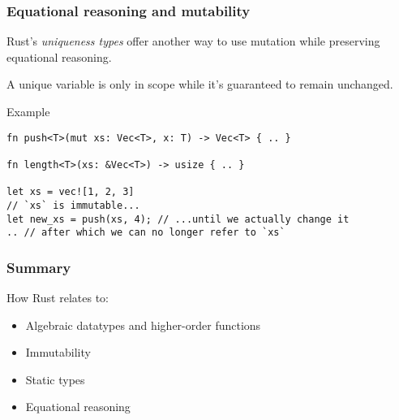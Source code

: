 \documentclass[t]{beamer}
\begin{document}
\begin{frame}[fragile]
\frametitle{Equational reasoning and mutability}
Rust's \emph{uniqueness types} offer another way to use mutation while
preserving equational reasoning.

\medskip

A unique variable is only in scope while it's guaranteed to remain unchanged.

\begin{block}{Example}
\begin{verbatim}
fn push<T>(mut xs: Vec<T>, x: T) -> Vec<T> { .. }

fn length<T>(xs: &Vec<T>) -> usize { .. }

let xs = vec![1, 2, 3]
// `xs` is immutable...
let new_xs = push(xs, 4); // ...until we actually change it
.. // after which we can no longer refer to `xs`
\end{verbatim}
\end{block}

\end{frame}


\begin{frame}[c]
\frametitle{Summary}

How Rust relates to:

\begin{itemize}
\item Algebraic datatypes and higher-order functions
\item Immutability
\item Static types
\item Equational reasoning
\end{itemize}

\end{frame}
\end{document}
